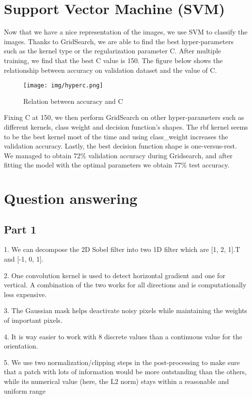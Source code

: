 \section{Support Vector Machine (SVM)}

Now that we have a nice representation of the images, we use SVM to classify the images. Thanks to GridSearch, we are able to find the best hyper-parameters such as the kernel type or the regularization parameter C. After multiple training, we find that the best C value is 150. The figure below shows the relationship between accuracy on validation dataset and the value of C.

\begin{figure}[H]
  \centering
    \texttt{[image: img/hyperc.png]}
    \caption{Relation between accuracy and C}
\end{figure}

Fixing C at 150, we then perform GridSearch on other hyper-parameters such as different kernels, class weight and decision function's shapes. The rbf kernel seems to be the best kernel most of the time and using class\_weight increases the validation accuracy. Lastly, the best decision function shape is one-versus-rest. We managed to obtain 72\% validation accuracy during Gridsearch, and after fitting the model with the optimal parameters we obtain 77\% test accuracy.

\section{Question answering}

\subsection{Part 1}

1. We can decompose the 2D Sobel filter into two 1D filter which are [1, 2, 1].T and [-1, 0, 1].

2. One convolution kernel is used to detect horizontal gradient and one for vertical. A combination of the two works for all directions and is computationally less expensive.

3. The Gaussian mask helps deactivate noisy pixels while maintaining the weights of important pixels.

4. It is way easier to work with 8 discrete values than a continuous value for the orientation.

5. We use two normalization/clipping steps in the post-processing to make sure that a patch with lots of information would be more outstanding than the others, while its numerical value (here, the L2 norm) stays within a reasonable and uniform range

